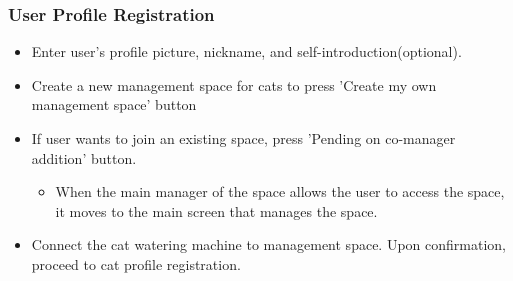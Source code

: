 \documentclass[conference]{IEEEtran}
\begin{document}
\subsubsection{User Profile Registration}
\begin{itemize}
    \begin{itemize}
        \item Enter user's profile picture, nickname, and self-introduction(optional).
        \item Create a new management space for cats to press 'Create my own management space' button 
        \item If user wants to join an existing space, press 'Pending on co-manager addition' button.
        \begin{itemize}
            \item When the main manager of the space allows the user to access the space, it moves to the main screen that manages the space.
        \end{itemize}
        \item Connect the cat watering machine to management space. Upon confirmation, proceed to cat profile registration.
        \vspace{0.3cm}
    \end{itemize}
\end{itemize}
\end{document}
